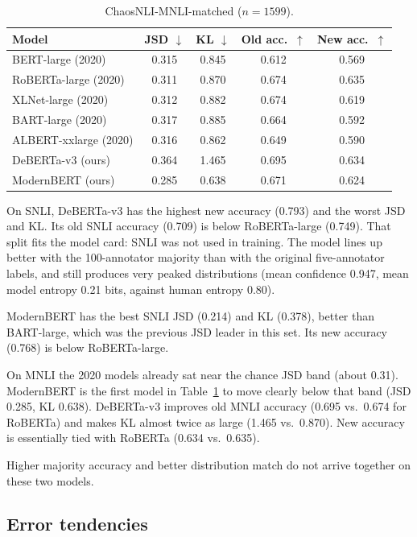 \documentclass[11pt,a4paper]{article}
\begin{document}
\begin{table}[H]
\centering
\small
\caption{ChaosNLI-MNLI-matched ($n=1599$).}
\label{tab:mnli}
\begin{tabular}{lcccc}
\toprule
Model & JSD $\downarrow$ & KL $\downarrow$ & Old acc.\ $\uparrow$ & New acc.\ $\uparrow$ \\
\midrule
BERT-large (2020) & 0.315 & 0.845 & 0.612 & 0.569 \\
RoBERTa-large (2020) & 0.311 & 0.870 & 0.674 & 0.635 \\
XLNet-large (2020) & 0.312 & 0.882 & 0.674 & 0.619 \\
BART-large (2020) & 0.317 & 0.885 & 0.664 & 0.592 \\
ALBERT-xxlarge (2020) & 0.316 & 0.862 & 0.649 & 0.590 \\
DeBERTa-v3 (ours) & 0.364 & 1.465 & 0.695 & 0.634 \\
ModernBERT (ours) & 0.285 & 0.638 & 0.671 & 0.624 \\
\bottomrule
\end{tabular}
\end{table}

On SNLI, DeBERTa-v3 has the highest new accuracy (0.793) and the worst JSD and KL. Its old SNLI accuracy (0.709) is below RoBERTa-large (0.749). That split fits the model card: SNLI was not used in training. The model lines up better with the 100-annotator majority than with the original five-annotator labels, and still produces very peaked distributions (mean confidence 0.947, mean model entropy 0.21 bits, against human entropy 0.80).

ModernBERT has the best SNLI JSD (0.214) and KL (0.378), better than BART-large, which was the previous JSD leader in this set. Its new accuracy (0.768) is below RoBERTa-large.

On MNLI the 2020 models already sat near the chance JSD band (about 0.31). ModernBERT is the first model in Table~\ref{tab:mnli} to move clearly below that band (JSD 0.285, KL 0.638). DeBERTa-v3 improves old MNLI accuracy (0.695 vs.\ 0.674 for RoBERTa) and makes KL almost twice as large (1.465 vs.\ 0.870). New accuracy is essentially tied with RoBERTa (0.634 vs.\ 0.635).

Higher majority accuracy and better distribution match do not arrive together on these two models.

\subsection{Error tendencies}
\label{sec:errors}
\end{document}
